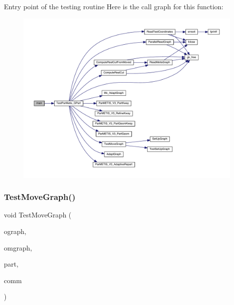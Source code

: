 Entry point of the testing routine Here is the call graph for this function\+:\nopagebreak
\begin{figure}[H]
\begin{center}
\leavevmode
\includegraphics[width=350pt]{a00437_a0ddf1224851353fc92bfbff6f499fa97_cgraph}
\end{center}
\end{figure}
\mbox{\label{a00437_a136ad3b21ef4f877c3100a997814e8ce}} 
\subsubsection{\texorpdfstring{Test\+Move\+Graph()}{TestMoveGraph()}}
{\footnotesize\ttfamily void Test\+Move\+Graph (\begin{DoxyParamCaption}\item[{\hyperlink{a00734}{graph\+\_\+t} $\ast$}]{ograph,  }\item[{\hyperlink{a00734}{graph\+\_\+t} $\ast$}]{omgraph,  }\item[{\hyperlink{a00876_aaa5262be3e700770163401acb0150f52}{idx\+\_\+t} $\ast$}]{part,  }\item[{M\+P\+I\+\_\+\+Comm}]{comm }\end{DoxyParamCaption})}

